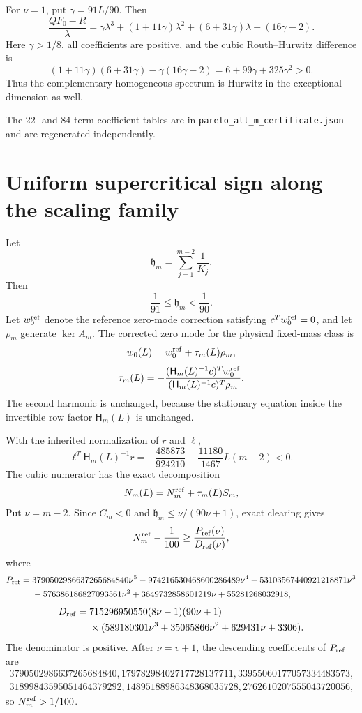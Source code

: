 For $\nu=1$, put $\gamma=91L/90$.  Then
\[
 \frac{QF_0-R}{\lambda}
 =\gamma\lambda^3+(1+11\gamma)\lambda^2
 +(6+31\gamma)\lambda+(16\gamma-2).
\]
Here $\gamma>1/8$, all coefficients are positive, and the cubic Routh--Hurwitz
difference is
\[
 (1+11\gamma)(6+31\gamma)-\gamma(16\gamma-2)
 =6+99\gamma+325\gamma^2>0.
\]
Thus the complementary homogeneous spectrum is Hurwitz in the exceptional
dimension as well.

The 22- and 84-term coefficient tables are in
\texttt{pareto\_all\_m\_certificate.json} and are regenerated independently.


\section*{Uniform supercritical sign along the scaling family}
Let
\[
 \mathfrak h_m=\sum_{j=1}^{m-2}\frac1{K_j}.
\]
Then
\[
 \frac1{91}\le\mathfrak h_m<\frac1{90}.
\]
Let $w_0^{\rm ref}$ denote the reference zero-mode correction satisfying
$c^Tw_0^{\rm ref}=0$, and let $\rho_m$ generate $\ker A_m$.  The corrected
zero mode for the physical fixed-mass class is
\[
 w_0(L)=w_0^{\rm ref}+\tau_m(L)\rho_m,
\]
\[
 \tau_m(L)=-\frac{(\mathsf H_m(L)^{-1}c)^Tw_0^{\rm ref}}
 {(\mathsf H_m(L)^{-1}c)^T\rho_m}.
\]
The second harmonic is unchanged, because the stationary equation inside the
invertible row factor $\mathsf H_m(L)$ is unchanged.

With the inherited normalization of $r$ and $\ell$,
\[
 \ell^T\mathsf H_m(L)^{-1}r
 =-\frac{485873}{924210}-\frac{11180}{1467}L(m-2)<0.
\]
The cubic numerator has the exact decomposition
\[
 N_m(L)=N_m^{\rm ref}+\tau_m(L)S_m,
\]
Put $\nu=m-2$.  Since $C_m<0$ and
$\mathfrak h_m\le\nu/(90\nu+1)$, exact clearing gives
\[
 N_m^{\rm ref}-\frac1{100}\ge\frac{P_{\rm ref}(\nu)}{D_{\rm ref}(\nu)},
\]
where
\begin{align*}
P_{\rm ref}={}&3790502986637265684840\nu^5
-974216530468600286489\nu^4-53103567440921218871\nu^3\\
&-576386186827093561\nu^2+3649732858601219\nu+55281268032918,
\end{align*}
\begin{align*}
D_{\rm ref}={}&715296950550(8\nu-1)(90\nu+1)\\
&\times(589180301\nu^3+35065866\nu^2+629431\nu+3306).
\end{align*}
The denominator is positive.  After $\nu=v+1$, the descending coefficients
of $P_{\rm ref}$ are
\[
\begin{gathered}
3790502986637265684840,17978298402717728137711,
33955060177057334483573,\\
31899843595051464379292,14895188986348368035728,
2762610207555043720056,
\end{gathered}
\]
so $N_m^{\rm ref}>1/100$.

